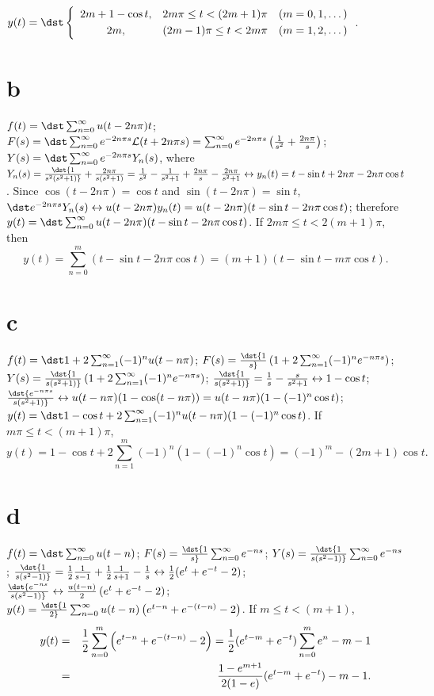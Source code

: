 \documentclass[dvips]{book}
\numberwithin{example}{section}
\numberwithin{equation}{section}
\numberwithin{theorem}{section}
\numberwithin{table}{section}
\numberwithin{figure}{section}
\begin{document}
 $y(t)=\dst\left\{\begin{array}{cll}2m+1-\cos t,&2m\pi\le
t<(2m+1)\pi&(m=0,1,\dots)\\[1\jot] 2m,&(2m-1)\pi\le
t<2m\pi&(m=1,2,\dots)\end{array}\right.$.

\part{b}
$f(t)=\dst\sum_{n=0}^\infty u(t-2n\pi)t$;
 $F(s)=\dst\sum_{n=0}^\infty e^{-2n\pi s}{\cal L}(t+2n\pi s)=
\sum_{n=0}^\infty e^{-2n\pi s}\left({1\over s^2}+{2n\pi\over
s}\right)$;
$Y(s)=\dst\sum_{n=0}^\infty e^{-2n\pi s}Y_n(s)$, where
$Y_n(s)=\dst{1\over s^2(s^2+1)}+{2n\pi\over s(s^2+1)}
={1\over s^2}-{1\over s^2+1}+{2n\pi\over s}-{2n\pi\over s^2+1}
\leftrightarrow y_n(t)=t-\sin t+2n\pi-2n\pi\cos t$.
Since $\cos(t-2n\pi)=\cos t$ and $\sin(t-2n\pi)=\sin t$,
$\dst e^{-2n\pi s}Y_n(s)\leftrightarrow
u(t-2n\pi)y_n(t)=u(t-2n\pi)(t-\sin t-2n\pi\cos t)$; therefore
$y(t)=\dst\sum_{n=0}^\infty u(t-2n\pi)(t-\sin t-2n\pi\cos t)$.
If $2m\pi\le t<2(m+1)\pi$, then
$$
y(t)=\sum_{n=0}^m (t-\sin t-2n\pi\cos t)=
(m+1)(t-\sin t-m\pi\cos t).
$$

\part{c}
$f(t)=\dst1+2\sum_{n=1}^\infty(-1)^n u(t-n\pi)$; $F(s)=\dst{1\over
s}\left(1+2\sum_{n=1}^\infty(-1)^n e^{-n\pi s}\right)$;
$Y(s)=\dst{1\over s(s^2+1)}\left(1+2\sum_{n=1}^\infty(-1)^n e^{-n\pi
s}\right)$;
 $\dst{1\over s(s^2+1)}={1\over s}-{s\over s^2+1}
\leftrightarrow 1-\cos t$;
 $\dst{e^{-n\pi s}\over s(s^2+1)}\leftrightarrow
u(t-n\pi)(1-\cos(t-n\pi))=u(t-n\pi)(1-(-1)^n\cos t)$;
$y(t)=\dst1-\cos t+
2\sum_{n=1}^\infty(-1)^n u(t-n\pi)(1-(-1)^n\cos t)$. If
$m\pi\le t<(m+1)\pi$,
$$
y(t)=1-\cos t+
2\sum_{n=1}^m (-1)^n(1-(-1)^n\cos t)
=(-1)^m-(2m+1)\cos t.
$$

\part{d}
$f(t)=\dst\sum_{n=0}^\infty u(t-n)$; $F(s)=\dst{1\over
s}\sum_{n=0}^\infty e^{-ns}$; $Y(s)=\dst{1\over
s(s^2-1)}\sum_{n=0}^\infty e^{-ns}$;
 $\dst{1\over s(s^2-1)}={1\over2}{1\over s-1}+{1\over2}{1\over
s+1}-{1\over s}
\leftrightarrow {1\over2}(e^t+e^{-t}-2)$;
 $\dst{e^{-ns}\over s(s^2-1)}\leftrightarrow
{u(t-n)\over2}\left(e^t+e^{-t}-2\right)$;
$y(t)=\dst{1\over2}
\sum_{n=0}^\infty u(t-n)\left(e^{t-n}+e^{-(t-n)}-2\right)$. If $m\le
t<(m+1)$,
\begin{eqnarray*}
y(t)&=&{1\over2}
\sum_{n=0}^m\left(e^{t-n}+e^{-(t-n)}-2\right)=
{1\over2}(e^{t-m}+e^{-t})\sum_{n=0}^me^n-m-1\\
&=&{1-e^{m+1}\over2(1-e)}(e^{t-m}+e^{-t})-m-1.
\end{eqnarray*}
\end{document}
